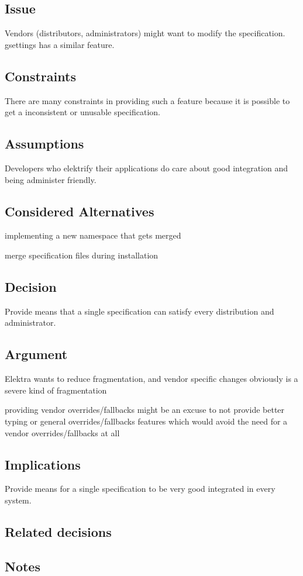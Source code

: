 \subsection*{Issue}

Vendors (distributors, administrators) might want to modify the specification. gsettings has a similar feature.

\subsection*{Constraints}

There are many constraints in providing such a feature because it is possible to get a inconsistent or unusable specification.

\subsection*{Assumptions}

Developers who elektrify their applications do care about good integration and being administer friendly.

\subsection*{Considered Alternatives}


\begin{DoxyItemize}
\item implementing a new namespace that gets merged
\item merge specification files during installation
\end{DoxyItemize}

\subsection*{Decision}

Provide means that a single specification can satisfy every distribution and administrator.

\subsection*{Argument}


\begin{DoxyItemize}
\item Elektra wants to reduce fragmentation, and vendor specific changes obviously is a severe kind of fragmentation
\item providing vendor overrides/fallbacks might be an excuse to not provide better typing or general overrides/fallbacks features which would avoid the need for a vendor overrides/fallbacks at all
\end{DoxyItemize}

\subsection*{Implications}

Provide means for a single specification to be very good integrated in every system.

\subsection*{Related decisions}

\subsection*{Notes}